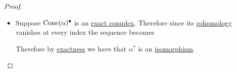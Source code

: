 \documentclass[../../../main]{subfiles}
\begin{document}
\begin{proof}
\begin{itemize}
          Using that the last \(\alpha^{\ast}\) is injective and \hyperref[def:exact-complex-sequence]{exactness} we have that
          \begin{align*}
            \ker g = \ker \alpha^{\ast} = \{0\}
          \end{align*}
          i.e: \(g\) is the zero map.

          Therefore we have that \(\cohomology{i}{\mCone{\alpha}{\bullet}} = 0\), meaning that the \hyperref[def:complex]{complex} is \hyperref[def:exact-complex]{exact}.
    \item[\(\impliedby\)] Suppose \(\operatorname{Cone}(\alpha)^{\bullet}\) is an \hyperref[def:exact-complex]{exact complex}.
          Therefore since its \hyperref[def:cohomology]{cohomology} vanishes at every index the sequence becomes
          \begin{center}
          \end{center}
          Therefore by \hyperref[def:exact-complex-sequence]{exactness} we have that \(\alpha^{\ast}\) is an \hyperref[def:categorical-isomorphism]{isomorphism}.
  \end{itemize}
\end{proof}
\end{document}
